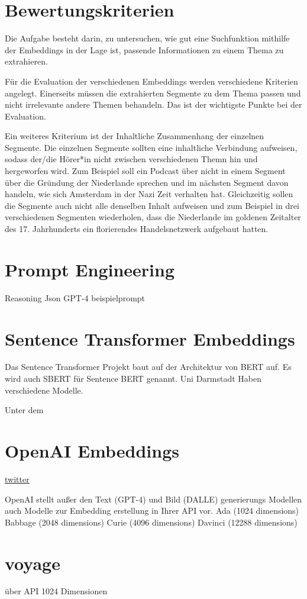 \section{Bewertungskriterien}


Die Aufgabe besteht darin, zu untersuchen, wie gut eine Suchfunktion mithilfe der Embeddings in der Lage ist, passende Informationen zu einem Thema zu extrahieren.

Für die Evaluation der verschiedenen Embeddings werden verschiedene Kriterien angelegt.
Einerseits müssen die extrahierten Segmente zu dem Thema passen und nicht irrelevante andere Themen behandeln.
Das ist der wichtigste Punkte bei der Evaluation.

Ein weiteres Kriterium ist der Inhaltliche Zusammenhang der einzelnen Segmente.
Die einzelnen Segmente sollten eine inhaltliche Verbindung aufweisen, sodass der/die Hörer*in nicht zwischen verschiedenen Themn hin und hergeworfen wird.
Zum Beispiel soll ein Podcast über  nicht in einem Segment über die Gründung der Niederlande sprechen und im nächsten Segment davon handeln, wie sich Amsterdam in der Nazi Zeit verhalten hat.
Gleichzeitig sollen die Segmente auch nicht alle denselben Inhalt aufweisen und zum Beispiel in drei verschiedenen Segmenten wiederholen, dass die Niederlande im goldenen Zeitalter des 17. Jahrhunderts ein florierendes Handelsnetzwerk aufgebaut hatten.

\section{Prompt Engineering}

Reasoning
Json
GPT-4
beispielprompt


\section{Sentence Transformer Embeddings}

Das Sentence Transformer Projekt baut auf der Architektur von BERT auf. 
Es wird auch SBERT für Sentence BERT genannt. 
Uni Darmstadt
Haben verschiedene Modelle.

Unter dem 


\section{OpenAI Embeddings}

\href{https://twitter.com/Nils_Reimers/status/1487014195568775173}{twitter}

OpenAI stellt außer den Text (GPT-4) und Bild (DALLE) generierungs Modellen auch Modelle zur Embedding erstellung in Ihrer API vor.
Ada (1024 dimensions)
Babbage (2048 dimensions)
Curie (4096 dimensions)
Davinci (12288 dimensions)

\section{voyage}

über API
1024 Dimensionen

